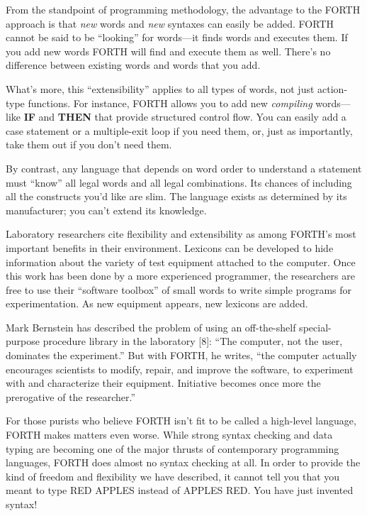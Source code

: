 From the standpoint of programming methodology, the advantage to the
FORTH approach is that \emph{new} words and \emph{new} syntaxes can
easily be added. FORTH cannot be said to be {}``looking'' for words---it
finds words and executes them. If you add new words FORTH will find
and execute them as well. There's no difference between existing words
and words that you add.

What's more, this {}``extensibility'' applies to all types of words,
not just action-type functions. For instance, FORTH allows you to
add new \emph{compiling} words---like \textbf{IF} and \textbf{THEN}
that provide structured control flow. You can easily add a case statement
or a multiple-exit loop if you need them, or, just as importantly,
take them out if you don't need them.

By contrast, any language that depends on word order to understand
a statement must {}``know'' all legal words and all legal combinations.
Its chances of including all the constructs you'd like are slim. The
language exists as determined by its manufacturer; you can't extend
its knowledge.

Laboratory researchers cite flexibility and extensibility as among
FORTH's most important benefits in their environment. Lexicons can
be developed to hide information about the variety of test equipment
attached to the computer. Once this work has been done by a more experienced
programmer, the researchers are free to use their {}``software toolbox''
of small words to write simple programs for experimentation. As new
equipment appears, new lexicons are added.

Mark Bernstein has described the problem of using an off-the-shelf
special-purpose procedure library in the laboratory {[}8{]}: {}``The
computer, not the user, dominates the experiment.'' But with FORTH,
he writes, {}``the computer actually encourages scientists to modify,
repair, and improve the software, to experiment with and characterize
their equipment. Initiative becomes once more the prerogative of the
researcher.''

For those purists who believe FORTH isn't fit to be called a high-level
language, FORTH makes matters even worse. While strong syntax checking
and data typing are becoming one of the major thrusts of contemporary
programming languages, FORTH does almost no syntax checking at all.
In order to provide the kind of freedom and flexibility we have described,
it cannot tell you that you meant to type RED APPLES instead of APPLES
RED. You have just invented syntax!

